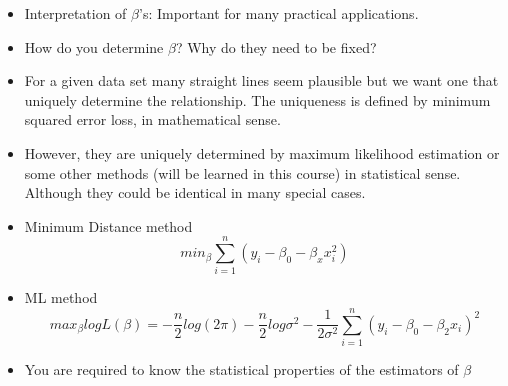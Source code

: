 \documentclass[12pt]{beamer}
\begin{document}
\begin{frame}
  \begin{itemize}
    \item<1-> Interpretation of $\beta$'s: Important for many
    practical applications.

    \item<2-> How do you determine $\beta$? Why do they need to be
    fixed?

    \item <3-> For a given data set many straight lines seem
    plausible but we want one that uniquely determine the
    relationship. The uniqueness is defined by minimum squared
    error loss, in mathematical sense.
    \end{itemize}
  \end{frame}
\begin{frame}
  \begin{itemize}
    \item<1->However, they are uniquely determined by maximum
    likelihood estimation or some other methods (will be learned
    in this course) in statistical sense. Although they could be
    identical in many special cases.
    \item<2-> Minimum Distance method
     \begin{equation}
     min_{\beta} \sum_{i=1}^{n}(y_{i}-\beta_{0}-\beta_{x}x_{i}^2)
     \end{equation}
   \end{itemize}
\end{frame}

\begin{frame}
  \begin{itemize}
     \item<1-> ML method
     \begin{equation}
     max_{\beta}logL(\beta)= -\frac{n}{2}log(2\pi)-\frac{n}{2}log\sigma^{2}-\frac{1}{2\sigma^2} \sum_{i=1}^{n}(y_{i}-\beta_{0}-\beta_{2}x_{i})^2
     \end{equation}
     \item<2-> You are required to know the statistical properties of
  the estimators of $\beta$
  \end{itemize}
\end{frame}


\end{document}
